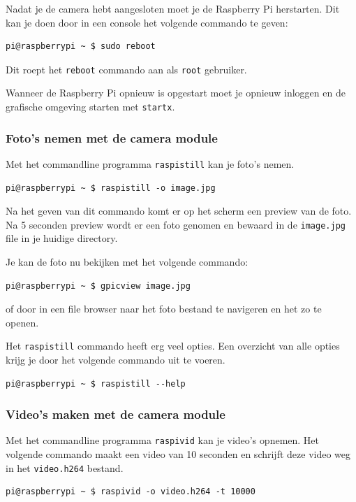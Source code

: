 \documentclass[a4paper]{article}
\begin{document}
    Nadat je de camera hebt aangesloten moet je de Raspberry Pi
herstarten.  Dit kan je doen door in een console het volgende commando
te geven:

\begin{lstlisting}
pi@raspberrypi ~ $ sudo reboot
\end{lstlisting}

    Dit roept het \texttt{reboot} commando aan als \texttt{root}
gebruiker.

    Wanneer de Raspberry Pi opnieuw is opgestart moet je opnieuw
inloggen en de grafische omgeving starten met \texttt{startx}.

    \subsubsection{Foto's nemen met de camera module}

      Met het commandline programma \texttt{raspistill} kan je foto's
nemen.

\begin{lstlisting}
pi@raspberrypi ~ $ raspistill -o image.jpg
\end{lstlisting}

    Na het geven van dit commando komt er op het scherm een preview van
de foto.  Na 5 seconden preview wordt er een foto genomen en bewaard
in de \texttt{image.jpg} file in je huidige directory.

    Je kan de foto nu bekijken met het volgende commando:
\begin{lstlisting}
pi@raspberrypi ~ $ gpicview image.jpg
\end{lstlisting}
    of door in een file browser naar het foto bestand te navigeren en
het zo te openen.

    Het \texttt{raspistill} commando heeft erg veel opties.  Een
overzicht van alle opties krijg je door het volgende commando uit te
voeren.
\begin{lstlisting}
pi@raspberrypi ~ $ raspistill --help
\end{lstlisting}

    \subsubsection{Video's maken met de camera module}

      Met het commandline programma \texttt{raspivid} kan je video's
opnemen. Het volgende commando maakt een video van 10 seconden en
schrijft deze video weg in het \texttt{video.h264} bestand.
\begin{lstlisting}
pi@raspberrypi ~ $ raspivid -o video.h264 -t 10000
\end{lstlisting}
\end{document}
